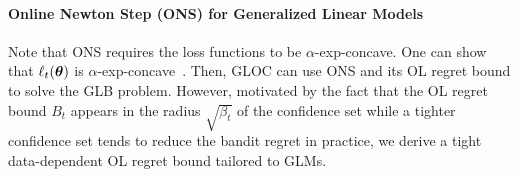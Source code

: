 \vspace{-4pt}
\paragraph{Online Newton Step (ONS) for Generalized Linear Models}


Note that ONS requires the loss functions to be $\alpha$-exp-concave.
One can show that $\ell_t({{\boldsymbol \theta}})$ is $\alpha$-exp-concave~\cite[Sec. 2.2]{hazan07logarithmic}.
Then, GLOC can use ONS and its OL regret bound to solve the GLB problem. %
However, motivated by the fact that the OL regret bound $B_t$ appears in the radius $\sqrt{\beta_t}$ of the confidence set while a tighter confidence set tends to reduce the bandit regret in practice, we derive a tight data-dependent OL regret bound tailored to GLMs.

